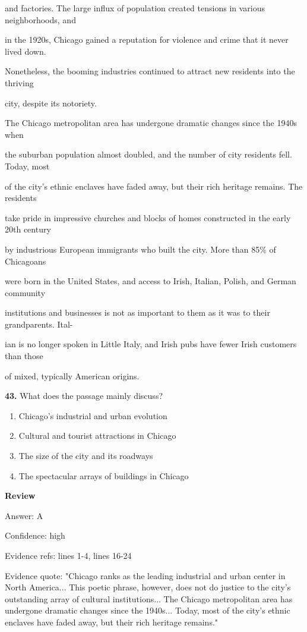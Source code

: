 \documentclass[12pt]{article}
\begin{document}
and factories. The large influx of population created tensions in various neighborhoods, and\par
in the 1920s, Chicago gained a reputation for violence and crime that it never lived down.\par
Nonetheless, the booming industries continued to attract new residents into the thriving\par
city, despite its notoriety.\par
The Chicago metropolitan area has undergone dramatic changes since the 1940s when\par
the suburban population almost doubled, and the number of city residents fell. Today, most\par
of the city's ethnic enclaves have faded away, but their rich heritage remains. The residents\par
take pride in impressive churches and blocks of homes constructed in the early 20th century\par
by industrious European immigrants who built the city. More than 85\% of Chicagoans\par
were born in the United States, and access to Irish, Italian, Polish, and German community\par
institutions and businesses is not as important to them as it was to their grandparents. Ital-\par
ian is no longer spoken in Little Italy, and Irish pubs have fewer Irish customers than those\par
of mixed, typically American origins.\par
\endgroup
\medskip
\noindent\textbf{43.} What does the passage mainly discuss?
\begin{enumerate}[label=(\Alph*),leftmargin=*,itemsep=0.2em]
\item Chicago's industrial and urban evolution
\item Cultural and tourist attractions in Chicago
\item The size of the city and its roadways
\item The spectacular arrays of buildings in Chicago
\end{enumerate}
\par
\begingroup
\setlength{\parskip}{0pt}
\setlength{\parindent}{0pt}
\textbf{Review}\par
Answer: A\par
Confidence: high\par
Evidence refs: lines 1-4, lines 16-24\par
Evidence quote: "Chicago ranks as the leading industrial and urban center in North America... This poetic phrase, however, does not do justice to the city's outstanding array of cultural institutions... The Chicago metropolitan area has undergone dramatic changes since the 1940s... Today, most of the city's ethnic enclaves have faded away, but their rich heritage remains."\par
\end{document}
